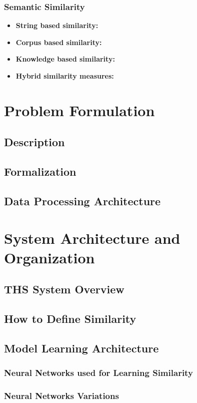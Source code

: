 \documentclass[12pt]{report}
\begin{document}
\subsection{Semantic Similarity}
\begin{itemize}[nolistsep]
	\item \textbf{String based similarity:}
	\item \textbf{Corpus based similarity:}
	\item \textbf{Knowledge based similarity:}
	\item \textbf{Hybrid similarity measures:}
\end{itemize}

\chapter{Problem Formulation} \label{chapter 3}
\section{Description}
\section{Formalization}
\section{Data Processing Architecture}

\chapter{System Architecture and Organization} \label{chapter 4}
\section{THS System Overview}
\section{How to Define Similarity}
\section{Model Learning Architecture}
\subsection{Neural Networks used for Learning Similarity}
\subsection{Neural Networks Variations}
\end{document}

